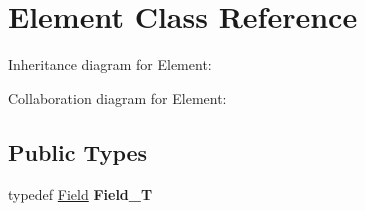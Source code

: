 \hypertarget{classElement}{}\section{Element Class Reference}
\label{classElement}


Inheritance diagram for Element\+:


Collaboration diagram for Element\+:
\subsection*{Public Types}
\begin{DoxyCompactItemize}
\item 
typedef \hyperlink{classField}{Field} {\bfseries Field\+\_\+T}\hypertarget{classElement_af63af4ed8d72a9bf3abfe86e4cd2e074}{}\label{classElement_af63af4ed8d72a9bf3abfe86e4cd2e074}

\end{DoxyCompactItemize}
